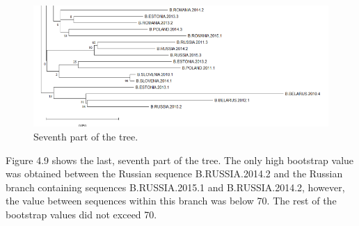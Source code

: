 \begin{figure}[h]
  \centering
  \includegraphics[width=0.7
\textwidth]{images/7.png}
  \caption{Seventh part of the tree.}
  \label{fig: Seventh part of the tree.}
\end{figure}

Figure 4.9 shows the last, seventh part of the tree.
The only high bootstrap value was obtained between the Russian sequence B.RUSSIA.2014.2 and the Russian branch containing sequences B.RUSSIA.2015.1 and B.RUSSIA.2014.2, however, the value between sequences within this branch was below 70. 
The rest of the bootstrap values did not exceed 70.




